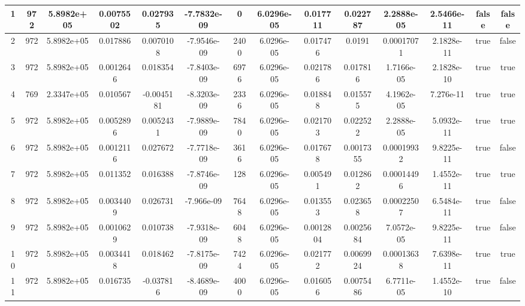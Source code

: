 \documentclass[a4paper, 14pt]{article}
\begin{document}
\begin{landscape}
\begin{longtable}{|c|c|c|c|c|c|c|c|c|c|c|c|c|c|}
    1   &   972   &  5.8982e+05  &   0.0075502   &    0.027935  &  -7.7832e-09  &     0   &  6.0296e-05  &   0.017711  &   0.022787  &  2.2888e-05   & 2.5466e-11  &  false     &  false  \\
    \hline
    2   &   972   &  5.8982e+05  &    0.017886   &   0.0070108  &  -7.9546e-09  &  2400   &  6.0296e-05  &   0.017476  &     0.0191  &  0.00017071   & 2.1828e-11  &  true      &  false  \\
    \hline
    3   &   972   &  5.8982e+05  &   0.0012646   &    0.018354  &  -7.8403e-09  &  6976   &  6.0296e-05  &   0.021786  &   0.017816  &  1.7166e-05   & 2.1828e-10  &  true      &  true   \\
    \hline
    4   &   769   &  2.3347e+05  &    0.010567   &  -0.0045181  &  -8.3203e-09  &  2336   &  6.0296e-05  &   0.018848  &   0.015575  &  4.1962e-05   &  7.276e-11  &  true      &  true   \\
    \hline
    5   &   972   &  5.8982e+05  &   0.0052896   &   0.0052431  &  -7.9889e-09  &  7840   &  6.0296e-05  &   0.021703  &   0.022522  &  2.2888e-05   & 5.0932e-11  &  true      &  true   \\
    \hline
    6   &   972   &  5.8982e+05  &   0.0012116   &    0.027672  &  -7.7718e-09  &  3616   &  6.0296e-05  &   0.017678  &  0.0017355  &  0.00019932   & 9.8225e-11  &  true      &  false  \\
    \hline
    7   &   972   &  5.8982e+05  &    0.011352   &    0.016388  &  -7.8746e-09  &   128   &  6.0296e-05  &   0.005491  &   0.012862  &  0.00014496   & 1.4552e-11  &  true      &  true   \\
    \hline
    8   &   972   &  5.8982e+05  &   0.0034409   &    0.026731  &   -7.966e-09  &  7648   &  6.0296e-05  &   0.013553  &   0.023658  &  0.00022507   & 6.5484e-11  &  true      &  false  \\
    \hline
    9   &   972   &  5.8982e+05  &   0.0010629   &    0.010738  &  -7.9318e-09  &  6048   &  6.0296e-05  &  0.0012804  &  0.0025684  &  7.0572e-05   & 9.8225e-11  &  true      &  false  \\
    \hline
    10   &   972   &  5.8982e+05  &   0.0034418   &    0.018462  &  -7.8175e-09  &  7424   &  6.0296e-05  &   0.021772  &  0.0069924  &  0.00013638   & 7.6398e-11  &  true      &  true   \\
    \hline
    11   &   972   &  5.8982e+05  &    0.016735   &   -0.037816  &  -8.4689e-09  &  4000   &  6.0296e-05  &   0.016056  &  0.0075486  &  6.7711e-05   & 1.4552e-10  &  true      &  false  \\

\end{longtable}
\end{landscape}
\end{document}
